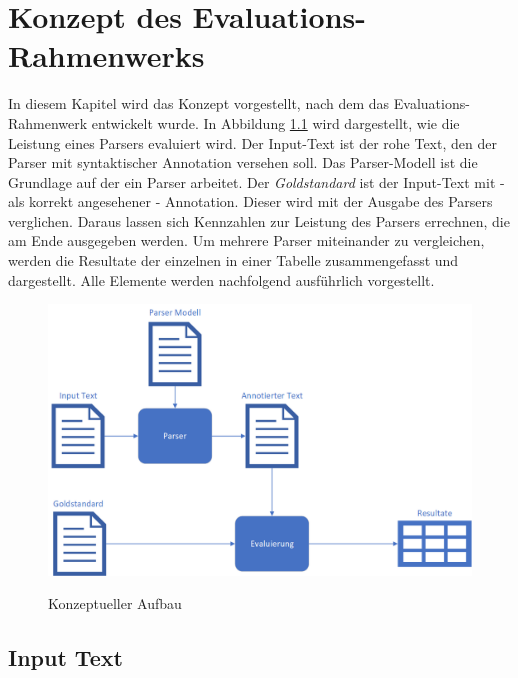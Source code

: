%
\chapter{Konzept des Evaluations-Rahmenwerks}
\label{sec:konzept}

In diesem Kapitel wird das Konzept vorgestellt, nach dem das Evaluations-Rahmenwerk entwickelt wurde. In Abbildung \ref{fig:konzept-aufbau} wird dargestellt, wie die Leistung eines Parsers evaluiert wird. Der Input-Text ist der rohe Text, den der Parser mit syntaktischer Annotation versehen soll. Das Parser-Modell ist die Grundlage auf der ein Parser arbeitet. Der \textit{Goldstandard} ist der Input-Text mit - als korrekt angesehener - Annotation. Dieser wird mit der Ausgabe des Parsers verglichen. Daraus lassen sich Kennzahlen zur Leistung des Parsers errechnen, die am Ende ausgegeben werden.
Um mehrere Parser miteinander zu vergleichen, werden die Resultate der einzelnen in einer Tabelle zusammengefasst und dargestellt. Alle Elemente werden nachfolgend ausführlich vorgestellt. 
\begin{figure} [h]

\includegraphics[width=\textwidth]{gfx/konzept-aufbau-png.png} 
\label{fig:konzept-aufbau}	
\caption{Konzeptueller Aufbau}	
\end{figure}
		
\section{Input Text}

